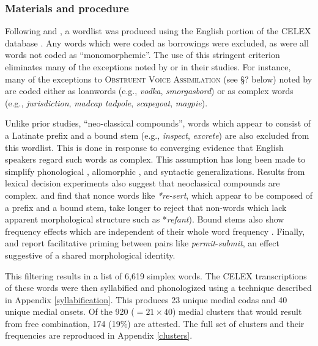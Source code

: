 \subsubsection{Materials and procedure}

Following \citet[ chap.~8]{Duanmu2009} and \citet[ chap.~3]{Hammond1999a}, 
a wordlist was produced using the English portion of the CELEX database \citep{CELEX}. Any words which were coded as borrowings were excluded, as were all words not coded as ``monomorphemic''. The use of this stringent criterion eliminates many of the exceptions noted by \citeauthor{Duanmu2009} or \citeauthor{Hammond1999a} in their studies. For instance, many of the exceptions to \textsc{Obstruent Voice Assimilation} (see \S? below) noted by \citet[74]{Hammond1999a} are coded either as loanwords (e.g., \emph{vodka}, \emph{smorgasbord}) or as complex words (e.g., \emph{jurisdiction}, \emph{madcap} \emph{tadpole}, \emph{scapegoat}, \emph{magpie}). 

Unlike prior studies, ``neo-classical compounds'', words which appear to consist of a Latinate prefix and a bound stem (e.g., \emph{inspect}, \emph{excrete}) are also excluded from this wordlist. This is done in response to converging evidence that English speakers regard such words as complex. This assumption has long been made to simplify phonological \citep{SPE}, allomorphic \citep[11f.]{Aronoff1976}, and syntactic \citep{Harley2009} generalizations. Results from lexical decision experiments also suggest that neoclassical compounds are complex. \citet{Taft1986} and \citet{Taft1975,Taft1976} find that nonce words like \emph{*re-sert}, which appear to be composed of a prefix and a bound stem, take longer to reject that non-words which lack apparent morphological structure such as *\emph{refant}). Bound stems also show frequency effects which are independent of their whole word frequency \citep{Taft1979,Taft2006}. Finally, \citet{Emmorey1989} and \citet{Forster2000} report facilitative priming between pairs like \emph{permit}-\emph{submit}, an effect suggestive of a shared morphological identity.  

This filtering results in a list of 6,619 simplex words. The CELEX transcriptions of these words were then syllabified and phonologized using a technique described in Appendix \ref{syllabification}. This produces 23 unique medial codas and 40 unique medial onsets. Of the 920 ($= 21 \times 40$) medial clusters that would result from free combination, 174 (19\%) are attested. The full set of clusters and their frequencies are reproduced in Appendix \ref{clusters}. 

